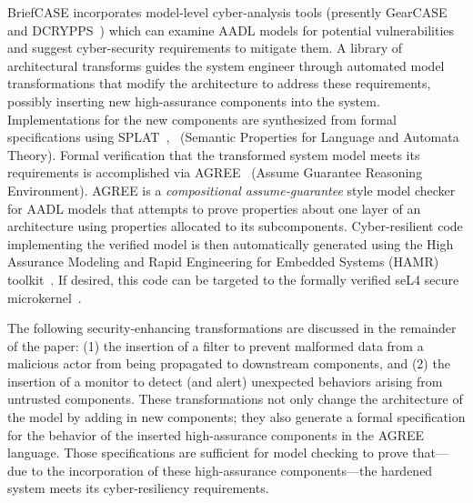 BriefCASE incorporates model-level cyber-analysis tools (presently
GearCASE~\cite{gearcase2020} and DCRYPPS~\cite{dcrypps2019}) which can
examine AADL models for potential vulnerabilities and suggest
cyber-security requirements to mitigate them.  A library of
architectural transforms guides the system engineer through automated
model transformations that modify the architecture to address these
requirements, possibly inserting new high-assurance components into
the system.  Implementations for the new components are synthesized
from formal specifications using
SPLAT~\cite{slind-hcss2020},~\cite{formal-filter-synth-langsec}
(Semantic Properties for Language and Automata Theory).  Formal
verification that the transformed system model meets its requirements
is accomplished via AGREE~\cite{agree2013} (Assume Guarantee Reasoning
Environment).
AGREE is a {\em compositional assume-guarantee} style model checker
for AADL models that attempts to prove properties about one layer of
an architecture using properties allocated to its subcomponents.
Cyber-resilient code implementing the verified model is then
automatically generated using the High Assurance Modeling and Rapid
Engineering for Embedded Systems (HAMR) toolkit~\cite{hamr}.  If
desired, this code can be targeted to the formally verified seL4
secure microkernel~\cite{sel4-2009}.


The following security-enhancing transformations are discussed in the
remainder of the paper: (1) the insertion of a filter to prevent
malformed data from a malicious actor from being propagated to
downstream components, and (2) the insertion of a monitor to detect
(and alert) unexpected behaviors arising from untrusted
components. These transformations not only change the architecture of
the model by adding in new components; they also generate a formal
specification for the behavior of the inserted high-assurance
components in the AGREE language. Those specifications are sufficient
for model checking to prove that---due to the incorporation of these
high-assurance components---the hardened system meets its
cyber-resiliency requirements.

